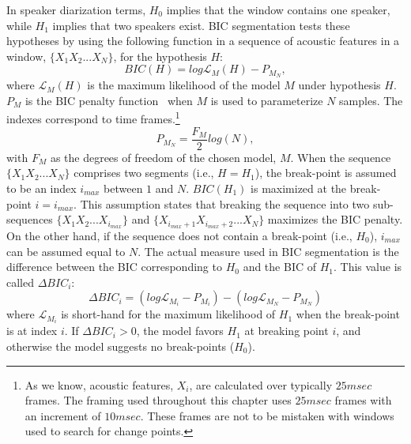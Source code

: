 In speaker diarization terms, $H_0$ implies that the window contains one speaker, while $H_1$ implies that two speakers exist. 
BIC segmentation tests these hypotheses by using the following function in a sequence of acoustic features in a window, $\{X_1X_2...X_N\}$, for the hypothesis $H$:
\begin{equation}
BIC(H) = log\mathcal{L}_{M}(H) - P_{M_{N}}, 
\end{equation}
where $\mathcal{L}_{M}(H)$ is the maximum likelihood of the model $M$ under hypothesis $H$. $P_M$ is the BIC penalty function~\cite{schwarz1978BIC} when $M$ is used to parameterize $N$ samples. The indexes correspond to time frames.\footnote{As we know, acoustic features, $X_i$, are calculated over typically $25 msec$ frames. 
The framing used throughout this chapter uses $25 msec$ frames with an increment of $10 msec$. These frames are not to be mistaken with windows used to search for change points.} 
\begin{equation}
P_{M_N} = \frac{F_M}{2}log(N),
\end{equation}
with $F_M$ as the degrees of freedom of the chosen model, $M$. 
When the sequence $\{X_1X_2...X_N\}$ comprises two segments (i.e., $H = H_1$), the break-point is assumed to be an index $i_{max}$ between $1$ and $N$. 
$BIC(H_1)$ is maximized at the break-point $i = i_{max}$. 
This assumption states that breaking the sequence into two sub-sequences $\{X_1X_2...X_{i_{max}}\}$ and $\{X_{i_{max}+1}X_{i_{max}+2}...X_N\}$ maximizes the BIC penalty. 
On the other hand, if the sequence does not contain a break-point (i.e., $H_0$), $i_{max}$ can be assumed equal to $N$. 
The actual measure used in BIC segmentation is the difference between the BIC corresponding to $H_0$ and the BIC of $H_1$. This value is called $\Delta BIC_i$: 
\begin{equation}
\Delta BIC_i = (log \mathcal{L}_{M_i} - P_{M_i}) - (log \mathcal{L}_{M_N} - P_{M_N})
\end{equation}
where $\mathcal{L}_{M_i}$ is short-hand for the maximum likelihood of $H_1$ when the break-point is at index $i$. 
If $\Delta BIC_i > 0$, the model favors $H_1$ at breaking point $i$, and otherwise the model suggests no break-points ($H_0$).  

